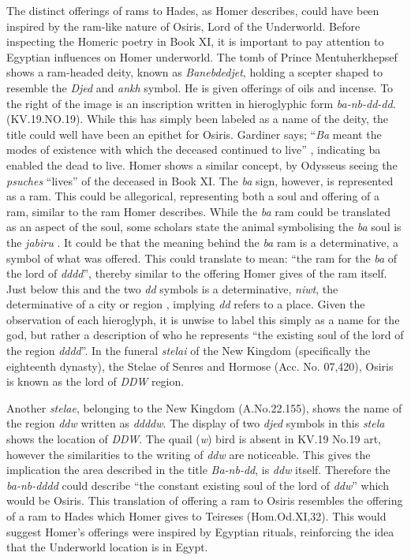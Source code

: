 	The distinct offerings of rams to Hades, as Homer describes, could have been inspired by the ram-like nature of Osiris, Lord of the Underworld. Before inspecting the Homeric poetry in Book XI, it is important to pay attention to Egyptian influences on Homer underworld. The tomb of Prince Mentuherkhepsef shows a ram-headed deity, known as \emph{Banebdedjet}, holding a scepter shaped to resemble the \emph{Djed} and \emph{ankh} symbol. He is given offerings of oils and incense. To the right of the image is an inscription written in hieroglyphic form \emph{ba-nb-dd-dd}. (KV.19.NO.19). While this has simply been labeled as a name of the deity, the title could well have been an epithet for Osiris. Gardiner says; “\emph{Ba} meant the modes of existence with which the deceased continued to live” \parencite[15]{Zabakar1968}, indicating ba enabled the dead to live. Homer shows a similar concept, by Odysseus seeing the \emph{psuches} “lives” of the deceased in Book XI. The \emph{ba} sign, however, is represented as a ram. This could be allegorical, representing both a soul and offering of a ram, similar to the ram Homer describes. While the \emph{ba} ram could be translated as an aspect of the soul, some scholars state the animal symbolising the \emph{ba} soul is the \emph{jabiru} \parencite[107]{Betro1996}. It could be that the meaning behind the \emph{ba} ram is a determinative, a symbol of what was offered. This could translate to mean: “the ram for the \emph{ba} of the lord of \emph{dddd}”, thereby similar to the offering Homer gives of the ram itself. Just below this and the two \emph{dd} symbols is a determinative, \emph{niwt}, the determinative of a city or region \parencite[190]{Betro1996}, implying \emph{dd} refers to a place. Given the observation of each hieroglyph, it is unwise to label this simply as a name for the god, but rather a description of who he represents “the existing soul of the lord of the region \emph{dddd}”. In the funeral \emph{stelai} of the New Kingdom (specifically the eighteenth dynasty), the Stelae of Senres and Hormose (Acc. No. 07,420), Osiris is known as the lord of \emph{DDW} region. 
	
	Another \emph{stelae}, belonging to the New Kingdom (A.No.22.155), shows the name of the region \emph{ddw} written as \emph{ddddw}. The display of two \emph{djed} symbols in this \emph{stela} shows the location of \emph{DDW}. The quail (\emph{w}) bird is absent in KV.19 No.19 art, however the similarities to the writing of \emph{ddw} are noticeable. This gives the implication the area described in the title \emph{Ba-nb-dd}, is \emph{ddw} itself. Therefore the \emph{ba-nb-dddd} could describe “the constant existing soul of the lord of \emph{ddw}” which would be Osiris. This translation of offering a ram to Osiris resembles the offering of a ram to Hades which Homer gives to Teireses (Hom.Od.XI,32). This would suggest Homer’s offerings were inspired by Egyptian rituals, reinforcing the idea that the Underworld location is in Egypt. 
	
